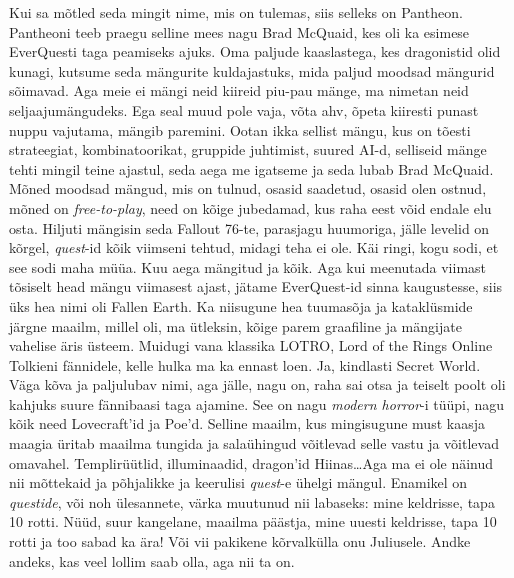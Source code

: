 
Kui sa mõtled seda mingit nime, mis on tulemas, siis selleks on Pantheon. Pantheoni teeb praegu selline mees nagu Brad McQuaid, kes oli ka esimese EverQuesti taga peamiseks ajuks. Oma paljude kaaslastega, kes dragonistid olid kunagi, kutsume seda mängurite kuldajastuks, mida paljud moodsad mängurid sõimavad. Aga meie ei mängi neid kiireid piu-pau mänge, ma nimetan neid seljaajumängudeks. Ega seal muud pole vaja, võta ahv, õpeta kiiresti punast nuppu vajutama, mängib paremini. Ootan ikka sellist mängu, kus on tõesti strateegiat, kombinatoorikat, gruppide juhtimist, suured AI-d, selliseid mänge tehti mingil teine ajastul, seda aega me igatseme ja seda lubab Brad McQuaid. Mõned moodsad mängud, mis on tulnud, osasid saadetud, osasid olen ostnud, mõned on \emph{free-to-play}, need on kõige jubedamad, kus raha eest võid endale elu osta. Hiljuti mängisin seda Fallout 76-te, parasjagu huumoriga, jälle  levelid on kõrgel, \emph{quest}-id kõik viimseni tehtud, midagi teha ei ole. Käi ringi, kogu sodi, et see sodi maha müüa. Kuu aega mängitud ja kõik. Aga kui meenutada viimast tõsiselt head mängu viimasest ajast, jätame EverQuest-id sinna kaugustesse, siis üks hea nimi oli Fallen Earth. Ka niisugune hea  tuumasõja ja kataklüsmide järgne maailm, millel oli, ma ütleksin, kõige parem graafiline ja mängijate vahelise äris üsteem. Muidugi vana klassika LOTRO, Lord of the Rings Online Tolkieni fännidele, kelle hulka ma ka ennast loen. Ja, kindlasti Secret World. Väga kõva ja paljulubav nimi, aga jälle, nagu on, raha sai otsa ja teiselt poolt oli kahjuks suure fännibaasi taga ajamine. See on nagu \emph{modern horror}-i tüüpi, nagu kõik need Lovecraft'id ja Poe'd. Selline maailm, kus mingisugune must kaasja maagia üritab  maailma tungida ja salaühingud võitlevad selle vastu ja võitlevad omavahel. Templirüütlid, illuminaadid, dragon'id Hiinas\ldots  Aga ma ei ole näinud nii mõttekaid ja põhjalikke ja keerulisi \emph{quest}-e ühelgi mängul. Enamikel on \emph{questide}, või noh ülesannete, värka muutunud nii labaseks: mine keldrisse, tapa 10 rotti. Nüüd, suur kangelane, maailma päästja, mine uuesti keldrisse, tapa 10 rotti ja too sabad ka ära! Või vii pakikene kõrvalkülla onu Juliusele. Andke andeks, kas veel lollim saab olla, aga nii ta on.

